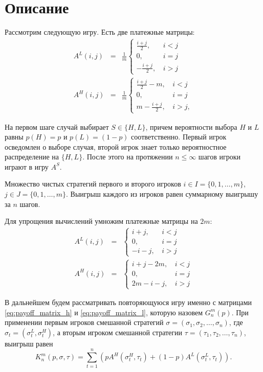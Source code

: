 \section{Описание}
Рассмотрим следующую игру.
Есть две платежные матрицы:
\begin{eqnarray*}
A^L(i, j) &=& \frac{1}{m}\begin{cases}
\frac{i+j}{2}, &\, i < j\\
0, &\, i = j\\
-\frac{i+j}{2}, &\, i > j
\end{cases}
\\
A^H(i, j) &=& \frac{1}{m}\begin{cases}
\frac{i+j}{2} - m, &\, i < j\\
0, &\, i = j\\
m - \frac{i+j}{2}, &\, i > j,
\end{cases}
\end{eqnarray*}

На первом шаге случай выбирает $ S \in \{H, L\} $, причем вероятности выбора $ H $ и $ L $ равны $ p(H) = p $ и $ p(L) = (1 - p) $ соответственно. Первый игрок осведомлен о выборе случая, второй игрок знает только вероятностное распределение на $ \{ H, L\} $.
После этого на протяжении $ n \leq \infty $ шагов игроки играют в игру $ A^S $.

Множество чистых стратегий первого и второго игроков 
$ i \in I = \{0, 1, \ldots, m\}$,
$ j \in J = \{0, 1, \ldots, m\} $.
Выигрыш каждого из игроков равен суммарному выигрышу за $ n $ шагов.

Для упрощения вычислений умножим платежные матрицы на $ 2m $:
\begin{eqnarray}
\label{eq:payoff_matrix_h}
A^L(i, j) &=& \begin{cases}
  i + j, &\, i < j\\
  0, &\, i = j\\
  -i - j, &\, i > j
\end{cases}
\\
\label{eq:payoff_matrix_l}
A^H(i, j) &=& \begin{cases}
  i + j - 2m, &\, i < j\\
  0, &\, i = j\\
  2m - i - j, &\, i > j
\end{cases}
\end{eqnarray}

В дальнейшем будем рассматривать повторяющуюся игру именно с матрицами \eqref{eq:payoff_matrix_h} и \eqref{eq:payoff_matrix_l}, которую назовем $ G_n^m(p) $. При применении первым игроков смешанной стратегий 
$ \sigma = (\sigma_1, \sigma_2, \ldots, \sigma_n) $, где 
$ \sigma_t = (\sigma_t^L, \sigma_t^H)$, 
а вторым игроком смешанной стратегии 
$ \tau = (\tau_1, \tau_2, \ldots, \tau_n) $, выигрыш равен
\begin{equation}
\label{eq:value_of_game_n}
K_n^m(p, \sigma, \tau) = \sum_{t=1}^n
    \left(
        pA^H(\sigma_t^H, \tau_t) + (1 - p)A^L(\sigma_t^L, \tau_t)
    \right).
\end{equation}